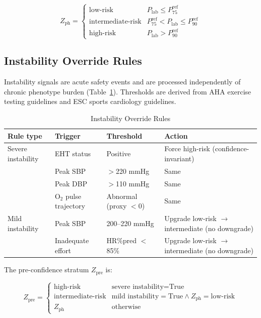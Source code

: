 \documentclass[12pt, a4paper]{article}
\begin{document}
\begin{equation}
\label{eq:phenotype_zone_en}
Z_{\text{ph}} =
\begin{cases}
\text{low-risk}          & P_{\text{lab}} \leq P_{75}^{\text{ref}} \\
\text{intermediate-risk} & P_{75}^{\text{ref}} < P_{\text{lab}} \leq P_{90}^{\text{ref}} \\
\text{high-risk}         & P_{\text{lab}} > P_{90}^{\text{ref}}
\end{cases}
\end{equation}

\subsection{Instability Override Rules}

Instability signals are acute safety events and are processed independently of
chronic phenotype burden (Table~\ref{tab:instability_rules_en}).
Thresholds are derived from AHA exercise testing guidelines\cite{Fletcher2013}
and ESC sports cardiology guidelines\cite{Pelliccia2022}.

\begin{table}[htbp]
\centering
\small
\caption{Instability Override Rules}
\label{tab:instability_rules_en}
\begin{tabular}{llll}
\toprule
Rule type & Trigger & Threshold & Action \\
\midrule
Severe instability & EHT status & Positive & Force high-risk (confidence-invariant) \\
 & Peak SBP & $>$220 mmHg & Same \\
 & Peak DBP & $>$110 mmHg & Same \\
 & O$_2$ pulse trajectory & Abnormal (proxy $<$0) & Same \\
\midrule
Mild instability & Peak SBP & 200--220 mmHg & Upgrade low-risk $\to$ intermediate (no downgrade) \\
 & Inadequate effort & HR\%pred $<$ 85\% & Upgrade low-risk $\to$ intermediate (no downgrade) \\
\bottomrule
\end{tabular}
\end{table}

The pre-confidence stratum $Z_{\text{pre}}$ is:

\begin{equation}
\label{eq:pre_confidence_zone_en}
Z_{\text{pre}} =
\begin{cases}
\text{high-risk}         & \text{severe instability} = \text{True} \\
\text{intermediate-risk} & \text{mild instability} = \text{True}
                           \wedge Z_{\text{ph}} = \text{low-risk} \\
Z_{\text{ph}}            & \text{otherwise}
\end{cases}
\end{equation}
\end{document}
